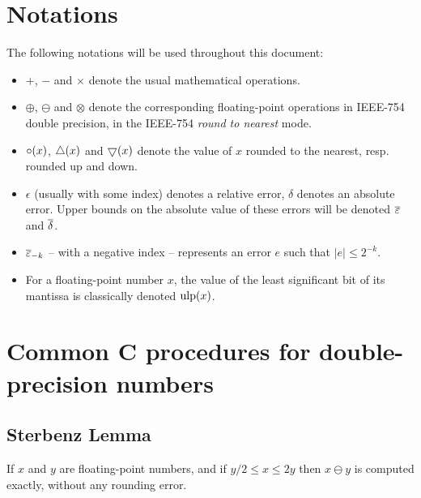 
\section{Notations\label{section:notations}}


The following notations will be used throughout this document:
\begin{itemize}

\item  $+$, $-$ and  $\times$ denote the usual
mathematical operations.

\item $\oplus$, $\ominus$ and $\otimes$ denote the
corresponding floating-point operations in IEEE-754 double precision,
in the IEEE-754 \emph{round to nearest} mode.

\item $\circ(x)$, $\bigtriangleup(x)$ and $\bigtriangledown(x)$ denote the value
  of $x$ rounded to the nearest, resp. rounded up and down.
  
\item $\epsilon$ (usually with some index) denotes a relative error,
  $\delta$ denotes an absolute error. Upper bounds on the absolute value of these errors
  will be denoted ${\overline{\varepsilon}}$ and ${\overline{\delta}}$.

\item ${\overline{\varepsilon}}_{-k}$ -- with a negative index -- represents an error $e$ such that $|e| \leq 2^{-k}$.
  
\item For a floating-point number $x$, the value of the least
  significant bit of its mantissa is classically denoted $\mbox{ulp}(x)$.

\end{itemize}




\section{Common C procedures for double-precision numbers\label{section:commonCdouble}}

\subsection{Sterbenz Lemma \label{sec:sterbenz}}

\begin{theorem}
\label{sterbenz}
If $x$ and $y$ are floating-point numbers, and if ${y}/{2} \leq x \leq
2y$ then $x\ominus y$ is computed exactly, without any rounding error.
\end{theorem}



